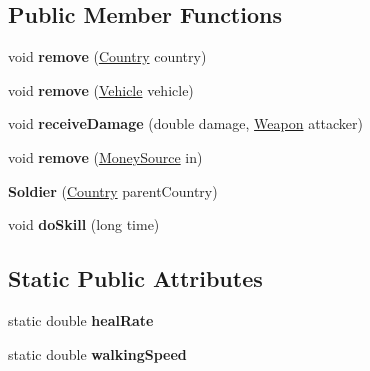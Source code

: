\subsection*{Public Member Functions}
\begin{DoxyCompactItemize}
\item 
void {\bfseries remove} (\hyperlink{classplanets_1_1_country}{Country} country)\hypertarget{classpeople_1_1_soldier_a9529c1b17194aac03b3aa4ccf52d2849}{}\label{classpeople_1_1_soldier_a9529c1b17194aac03b3aa4ccf52d2849}

\item 
void {\bfseries remove} (\hyperlink{classtools_1_1vehicles_1_1_vehicle}{Vehicle} vehicle)\hypertarget{classpeople_1_1_soldier_afa36c9095d38bd744ed494e476975ab4}{}\label{classpeople_1_1_soldier_afa36c9095d38bd744ed494e476975ab4}

\item 
void {\bfseries receive\+Damage} (double damage, \hyperlink{classtools_1_1weapons_1_1_weapon}{Weapon} attacker)\hypertarget{classpeople_1_1_soldier_a1c7c1740a2056d9093ad342206867dd1}{}\label{classpeople_1_1_soldier_a1c7c1740a2056d9093ad342206867dd1}

\item 
void {\bfseries remove} (\hyperlink{classuniverse_1_1_money_source}{Money\+Source} in)\hypertarget{classpeople_1_1_soldier_a7e568f0ebcc2af82ac463923a6221e9b}{}\label{classpeople_1_1_soldier_a7e568f0ebcc2af82ac463923a6221e9b}

\item 
{\bfseries Soldier} (\hyperlink{classplanets_1_1_country}{Country} parent\+Country)\hypertarget{classpeople_1_1_soldier_a925e6aa433f95f45184cbb23881ce9bc}{}\label{classpeople_1_1_soldier_a925e6aa433f95f45184cbb23881ce9bc}

\item 
void {\bfseries do\+Skill} (long time)\hypertarget{classpeople_1_1_soldier_a7d97a492612db4e5eda832d9b679b6b1}{}\label{classpeople_1_1_soldier_a7d97a492612db4e5eda832d9b679b6b1}

\end{DoxyCompactItemize}
\subsection*{Static Public Attributes}
\begin{DoxyCompactItemize}
\item 
static double {\bfseries heal\+Rate}\hypertarget{classpeople_1_1_soldier_a35647e4b3b25b4c529de671324985e24}{}\label{classpeople_1_1_soldier_a35647e4b3b25b4c529de671324985e24}

\item 
static double {\bfseries walking\+Speed}\hypertarget{classpeople_1_1_soldier_a34da6eacc3f18e1b58c540ab20351465}{}\label{classpeople_1_1_soldier_a34da6eacc3f18e1b58c540ab20351465}

\end{DoxyCompactItemize}
